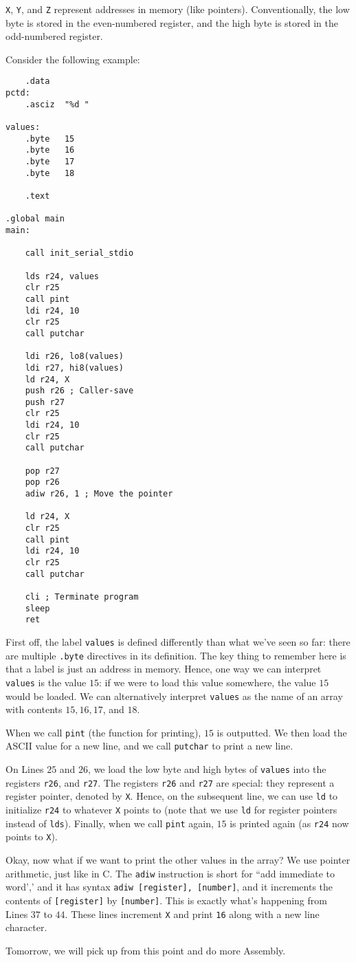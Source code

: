 \verb!X!, \verb!Y!, and \verb!Z! represent addresses in memory (like pointers). Conventionally, the low byte is stored in the even-numbered register, and the high byte is stored in the odd-numbered register. 


Consider the following example:

\begin{lstlisting}
    .data
pctd: 
    .asciz  "%d "

values:
    .byte   15
    .byte   16
    .byte   17
    .byte   18
    
    .text

.global main
main:

    call init_serial_stdio
    
    lds r24, values
    clr r25
    call pint
    ldi r24, 10
    clr r25
    call putchar
    
    ldi r26, lo8(values)
    ldi r27, hi8(values)
    ld r24, X
    push r26 ; Caller-save
    push r27
    clr r25
    ldi r24, 10
    clr r25
    call putchar
    
    pop r27
    pop r26
    adiw r26, 1 ; Move the pointer
    
    ld r24, X
    clr r25
    call pint
    ldi r24, 10
    clr r25
    call putchar
    
    cli ; Terminate program
    sleep 
    ret
\end{lstlisting}

First off, the label \verb!values! is defined differently than what we've seen so far: there are multiple \verb!.byte! directives in its definition. The key thing to remember here is that a label is just an address in memory. Hence, one way we can interpret \verb!values! is the value $15$: if we were to load this value somewhere, the value $15$ would be loaded. We can alternatively interpret \verb!values! as the name of an array with contents $15, 16, 17$, and $18$.


When we call \verb!pint! (the function for printing), $15$ is outputted. We then load the ASCII value for a new line, and we call \verb!putchar! to print a new line. 

On Lines $25$ and $26$, we load the low byte and high bytes of \verb!values! into the registers \verb!r26!, and \verb!r27!. The registers \verb!r26! and \verb!r27! are special: they represent a register pointer, denoted by \verb!X!. Hence, on the subsequent line, we can use \verb!ld! to initialize \verb!r24! to whatever \verb!X! points to (note that we use \verb!ld! for register pointers instead of \verb!lds!). Finally, when we call \verb!pint! again, $15$ is printed again (as \verb!r24! now points to \verb!X!).

Okay, now what if we want to print the other values in the array? We use pointer arithmetic, just like in C. The \verb!adiw! instruction is short for ``add immediate to word',' and it has syntax \verb!adiw [register], [number]!, and it increments the contents of \verb![register]! by \verb![number]!. This is exactly what's happening from Lines $37$ to $44$. These lines increment \verb!X! and print \verb!16! along with a new line character.


Tomorrow, we will pick up from this point and do more Assembly.